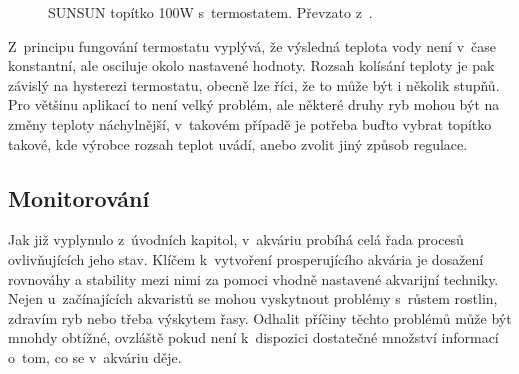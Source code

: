         \begin{figure}[h!]
            \centering

            \caption{SUNSUN topítko 100W s~termostatem. Převzato z~\cite{eshop-rostlinna-akvaria}.}
            \label{fig:obrazky-topeni-topitko-jpg}
        \end{figure}
        
        Z~principu fungování termostatu vyplývá, že výsledná teplota vody není v~čase konstantní, ale osciluje okolo nastavené hodnoty. Rozsah kolísání teploty je pak závislý na hysterezi termostatu, obecně lze říci, že to může být i několik stupňů. Pro většinu aplikací to není velký problém, ale některé druhy ryb mohou být na změny teploty náchylnější, v~takovém případě je potřeba buďto vybrat topítko takové, kde výrobce rozsah teplot uvádí, anebo zvolit jiný způsob regulace. 

    \subsection{Monitorování}
        Jak již vyplynulo z~úvodních kapitol, v~akváriu probíhá celá řada procesů ovlivňujících jeho stav. Klíčem k~vytvoření prosperujícího akvária je dosažení rovnováhy a stability mezi nimi za pomoci vhodně nastavené akvarijní techniky. Nejen u~začínajících akvaristů se mohou vyskytnout problémy s~růstem rostlin, zdravím ryb nebo třeba výskytem řasy. Odhalit příčiny těchto problémů může být mnohdy obtížné, ovzláště pokud není k~dispozici dostatečné množství informací o~tom, co se v~akváriu děje. 
        
